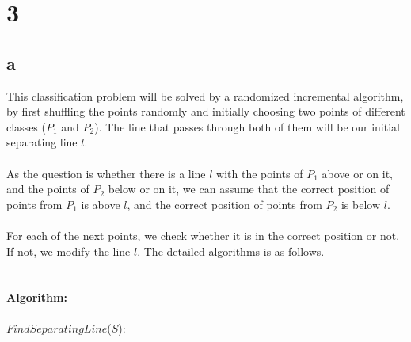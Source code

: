 \section*{3}
\subsection*{a}

This classification problem will be solved by a randomized incremental algorithm, by first shuffling the points randomly and initially choosing two points of different classes 
($P_1$ and $P_2$). The line that passes through both of them will be our initial separating line $l$. \\
\\
As the question is whether there is a line $l$ with the points of $P_1$ above or on it, and the points of $P_2$ below or on it, we can assume that the correct position of points from $P_1$ is above $l$, and the correct position of points from $P_2$ is below $l$.\\
\\
For each of the next points, we check whether it is in the correct position or not. If not, we modify the line $l$. The detailed algorithms is as follows. \\
\\
\\
\textbf{Algorithm:}\\
\\
$FindSeparatingLine$($S$):

